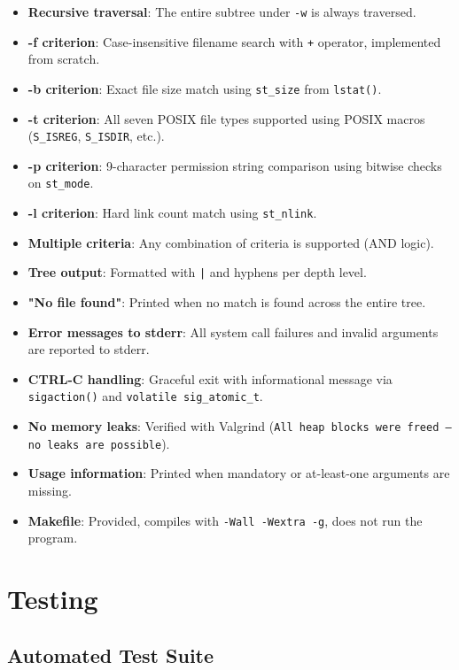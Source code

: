 \documentclass[12pt, a4paper]{article}
\begin{document}
\begin{itemize}[noitemsep]
    \item \textbf{Recursive traversal}: The entire subtree under \texttt{-w} is always traversed.
    \item \textbf{-f criterion}: Case-insensitive filename search with \texttt{+} operator, implemented from scratch.
    \item \textbf{-b criterion}: Exact file size match using \texttt{st\_size} from \texttt{lstat()}.
    \item \textbf{-t criterion}: All seven POSIX file types supported using POSIX macros (\texttt{S\_ISREG}, \texttt{S\_ISDIR}, etc.).
    \item \textbf{-p criterion}: 9-character permission string comparison using bitwise checks on \texttt{st\_mode}.
    \item \textbf{-l criterion}: Hard link count match using \texttt{st\_nlink}.
    \item \textbf{Multiple criteria}: Any combination of criteria is supported (AND logic).
    \item \textbf{Tree output}: Formatted with \texttt{|} and hyphens per depth level.
    \item \textbf{"No file found"}: Printed when no match is found across the entire tree.
    \item \textbf{Error messages to stderr}: All system call failures and invalid arguments are reported to stderr.
    \item \textbf{CTRL-C handling}: Graceful exit with informational message via \texttt{sigaction()} and \texttt{volatile sig\_atomic\_t}.
    \item \textbf{No memory leaks}: Verified with Valgrind (\texttt{All heap blocks were freed -- no leaks are possible}).
    \item \textbf{Usage information}: Printed when mandatory or at-least-one arguments are missing.
    \item \textbf{Makefile}: Provided, compiles with \texttt{-Wall -Wextra -g}, does not run the program.
\end{itemize}

\section{Testing}

\subsection{Automated Test Suite}
\end{document}
